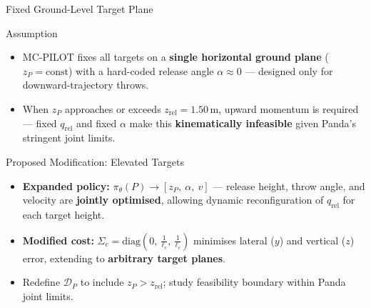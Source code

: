 \documentclass{if-beamer}
\begin{document}
\begin{frame}{Fixed Ground-Level Target Plane}
    \begin{alertblock}{Assumption}
        \begin{itemize}
            \item MC-PILOT fixes all targets on a \textbf{single horizontal ground plane} ($z_P = \text{const}$) with a hard-coded release angle $\alpha \approx 0$ --- designed only for downward-trajectory throws.
            \item When $z_P$ approaches or exceeds $z_\text{rel} = 1.50$\,m, upward momentum is required --- fixed $q_\text{rel}$ and fixed $\alpha$ make this \textbf{kinematically infeasible} given Panda's stringent joint limits.
        \end{itemize}
    \end{alertblock}
    \begin{block}{Proposed Modification: Elevated Targets}
        \begin{itemize}
            \item \textbf{Expanded policy:} $\pi_\theta(P) \rightarrow [z_P,\ \alpha,\ v]$ --- release height, throw angle, and velocity are \textbf{jointly optimised}, allowing dynamic reconfiguration of $q_\text{rel}$ for each target height.
            \item \textbf{Modified cost:} $\Sigma_c = \text{diag}\!\left(0,\ \tfrac{1}{\ell_c},\ \tfrac{1}{\ell_c}\right)$ minimises lateral ($y$) and vertical ($z$) error, extending to \textbf{arbitrary target planes}.
            \item Redefine $\mathcal{D}_P$ to include $z_P > z_\text{rel}$; study feasibility boundary within Panda joint limits.
        \end{itemize}
    \end{block}
\end{frame}
\end{document}
